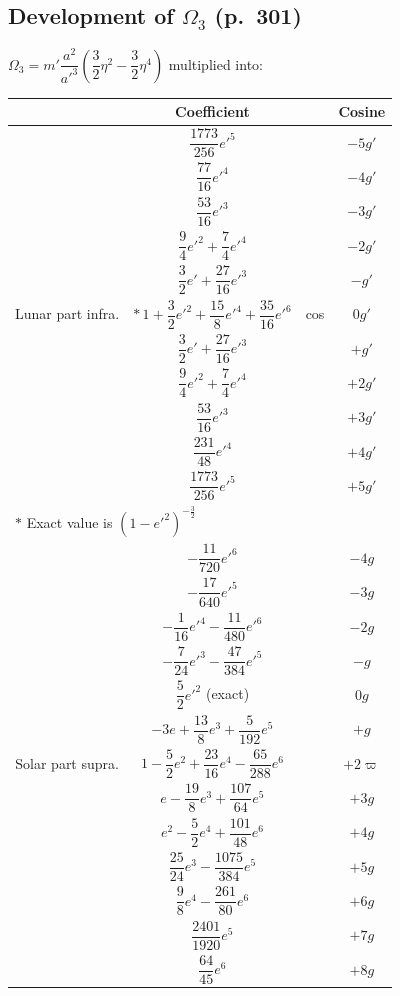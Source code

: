 \documentclass[11pt,a4paper]{book}
\begin{document}
\subsection{Development of $\Omega_3$ (p.~301)}

\noindent
$\Omega_3 = m' \dfrac{a^2}{a'^3} \left(\dfrac{3}{2}\eta^2 - \dfrac{3}{2}\eta^4\right)$ multiplied into:

\begin{center}
\begin{tabular}{c|c|c|c}
\toprule
& Coefficient & & Cosine \\
\midrule
\multirow{11}{*}{\parbox{2.5cm}{\centering Lunar part infra.}} 
& $\dfrac{1773}{256}e'^5$ & \multirow{11}{*}{cos} & $-5g'$ \\
& $\dfrac{77}{16}e'^4$ & & $-4g'$ \\
& $\dfrac{53}{16}e'^3$ & & $-3g'$ \\
& $\dfrac{9}{4}e'^2 + \dfrac{7}{4}e'^4$ & & $-2g'$ \\
& $\dfrac{3}{2}e' + \dfrac{27}{16}e'^3$ & & $-g'$ \\
& $*\,1 + \dfrac{3}{2}e'^2 + \dfrac{15}{8}e'^4 + \dfrac{35}{16}e'^6$ & & $0g'$ \\
& $\dfrac{3}{2}e' + \dfrac{27}{16}e'^3$ & & $+g'$ \\
& $\dfrac{9}{4}e'^2 + \dfrac{7}{4}e'^4$ & & $+2g'$ \\
& $\dfrac{53}{16}e'^3$ & & $+3g'$ \\
& $\dfrac{231}{48}e'^4$ & & $+4g'$ \\
& $\dfrac{1773}{256}e'^5$ & & $+5g'$ \\[6pt]
\multicolumn{4}{l}{$*$ Exact value is $(1 - e'^2)^{-\frac{3}{2}}$} \\
\midrule
\multirow{13}{*}{\parbox{2.5cm}{\centering Solar part supra.}} 
& $-\dfrac{11}{720}e'^6$ & \multirow{13}{*}{} & $-4g$ \\
& $-\dfrac{17}{640}e'^5$ & & $-3g$ \\
& $-\dfrac{1}{16}e'^4 - \dfrac{11}{480}e'^6$ & & $-2g$ \\
& $-\dfrac{7}{24}e'^3 - \dfrac{47}{384}e'^5$ & & $-g$ \\
& $\dfrac{5}{2}e'^2$ (exact) & & $0g$ \\
& $-3e + \dfrac{13}{8}e^3 + \dfrac{5}{192}e^5$ & & $+g$ \\
& $1 - \dfrac{5}{2}e^2 + \dfrac{23}{16}e^4 - \dfrac{65}{288}e^6$ & $+2g$ & $+2\varpi$ \\
& $e - \dfrac{19}{8}e^3 + \dfrac{107}{64}e^5$ & & $+3g$ \\
& $e^2 - \dfrac{5}{2}e^4 + \dfrac{101}{48}e^6$ & & $+4g$ \\
& $\dfrac{25}{24}e^3 - \dfrac{1075}{384}e^5$ & & $+5g$ \\
& $\dfrac{9}{8}e^4 - \dfrac{261}{80}e^6$ & & $+6g$ \\
& $\dfrac{2401}{1920}e^5$ & & $+7g$ \\
& $\dfrac{64}{45}e^6$ & & $+8g$ \\
\bottomrule
\end{tabular}
\end{center}
\end{document}

